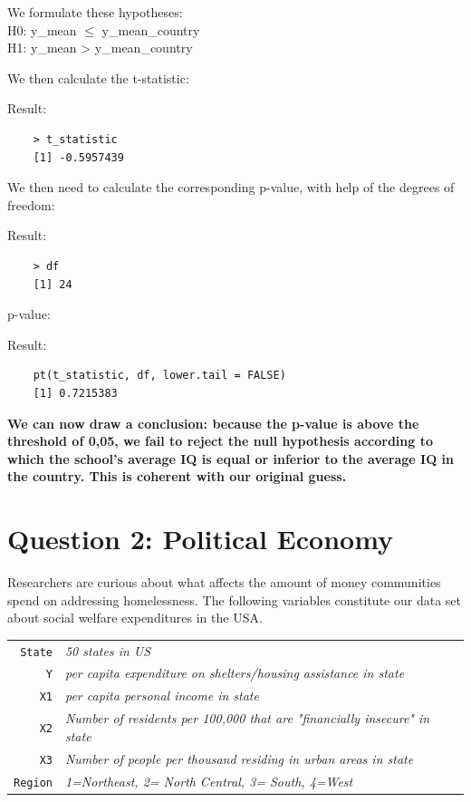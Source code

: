 \documentclass[12pt,letterpaper]{article}
\begin{document}
We formulate these hypotheses: \\
H0: y{\_mean} $\leq$ y{\_mean\_country}  \\
H1: y{\_mean} >  y{\_mean\_country} \\
\vspace{.25cm}

We then calculate the t-statistic: 
  
Result: 
\begin{verbatim}
	> t_statistic
	[1] -0.5957439
\end{verbatim}
\vspace{1cm}

We then need to calculate the corresponding p-value, with help of the degrees of freedom:
 
Result: 
\begin{verbatim}
	> df
	[1] 24
\end{verbatim}

p-value:
 
Result: 
\begin{verbatim}
	pt(t_statistic, df, lower.tail = FALSE)
	[1] 0.7215383
\end{verbatim}

\textbf {We can now draw a conclusion: because the p-value is above the threshold of 0,05, we fail to reject the null hypothesis according to which the school's average IQ is equal or inferior to the average IQ in the country. This is coherent with our original guess.}







\newpage

	\section*{Question 2: Political Economy}

\noindent Researchers are curious about what affects the amount of money communities spend on addressing homelessness. The following variables constitute our data set about social welfare expenditures in the USA. \\
\vspace{.5cm}


\begin{tabular}{r|l}
	\texttt{State} &\emph{50 states in US} \\
	\texttt{Y} & \emph{per capita expenditure on shelters/housing assistance in state}\\
	\texttt{X1} &\emph{per capita personal income in state} \\
	\texttt{X2} &  \emph{Number of residents per 100,000 that are "financially insecure" in state}\\
	\texttt{X3} &  \emph{Number of people per thousand residing in urban areas in state} \\
	\texttt{Region} &  \emph{1=Northeast, 2= North Central, 3= South, 4=West} \\
\end{tabular}
\end{document}
